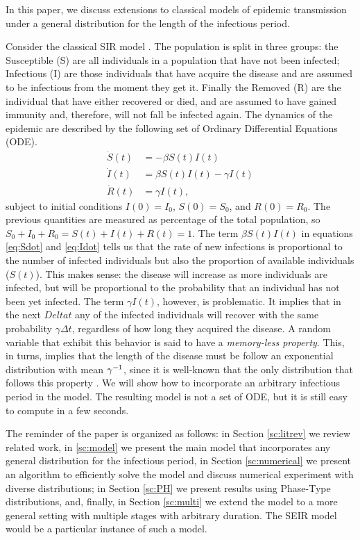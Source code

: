 \documentclass[twoside,USenglish,10pt]{article}
\newcommand{\gami}{\ensuremath\gamma^{-1}\xspace}
\begin{document}
In this paper, we discuss extensions to classical models of epidemic transmission under a general distribution for the length of the infectious period.

Consider the classical SIR model \cite{kerm.mcke27,murr07,chas09}. The population is split in three groups: the Susceptible (S) are all individuals in a population that have not been infected; Infectious (I) are those individuals that have acquire the disease and are assumed to be infectious from the moment they get it. Finally the Removed (R) are the individual that have either recovered or died, and are assumed to have gained immunity and, therefore, will not fall be infected again.
The dynamics of the epidemic are described by the following set of Ordinary Differential Equations (ODE).
\begin{subequations}
	\begin{align}
		\dot{S}(t) &= -\beta S(t)I(t)  \label{eq:Sdot} \\
		\dot{I}(t) &= \beta S(t)I(t) - \gamma I(t) \label{eq:Idot}  \\
		\dot{R}(t) &= \gamma I(t), \label{eq:Rdot}
	\end{align}
\end{subequations}
subject to initial conditions $I(0)=I_0$, $S(0)=S_0$, and $R(0)=R_0$. The previous quantities are measured as percentage of the total population, so $S_0+I_0+R_0=S(t)+I(t)+R(t)=1$.
The term $\beta S(t)I(t)$ in equations \eqref{eq:Sdot} and \eqref{eq:Idot} tells us that the rate of new infections is proportional to the number of infected individuals but also the proportion of available individuals ($S(t)$).
This makes sense: the disease will increase as more individuals are infected, but will be proportional to the probability that an individual has not been yet infected. 
The term $\gamma I(t)$, however, is problematic. It implies that in the next $Delta t$ any of the infected individuals will recover with the same probability $\gamma \Delta t$, regardless of how long they acquired the disease.
A random variable that exhibit this behavior is said to have a \emph{memory-less property}.
This, in turns, implies that the length of the disease must be follow an exponential distribution with mean $\gami$, since it is well-known that the only distribution that follows this property \cite{kulk95}.
We will show how to incorporate an arbitrary infectious period in the model. The resulting model is not a set of ODE, but it is still easy to compute in a few seconds.

The reminder of the paper is organized as follows: in Section \ref{sc:litrev} we review related work, in \ref{sc:model} we present the main model that incorporates any general distribution for the infectious period, in Section \ref{sc:numerical} we present an algorithm to efficiently solve the model and discuss numerical experiment with diverse distributions; in Section \ref{sc:PH} we present results using Phase-Type distributions, and, finally, in Section \ref{sc:multi} we extend the model to a more general setting with multiple stages with arbitrary duration. The SEIR model would be a particular instance of such a model. 
\end{document}
